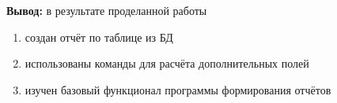 \documentclass[pscyr, 12pt]{hedlab}
\begin{document}
    \noindent\textbf{Вывод:} в результате проделанной работы
    \vspace*{-1em}
    \begin{enumerate}\itemsep-5pt
        \item создан отчёт по таблице из БД
        \item использованы команды для расчёта дополнительных полей
        \item изучен базовый функционал программы формирования отчётов
    \end{enumerate}
\end{document}
